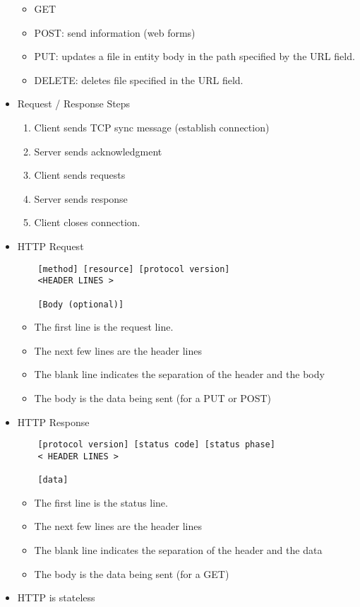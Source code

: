 \documentclass[]{article}
\providecommand{\tightlist}{%
  \setlength{\itemsep}{0pt}\setlength{\parskip}{0pt}}
\begin{document}
\begin{itemize}
  \begin{itemize}
  \tightlist
  \item
    GET
  \item
    POST: send information (web forms)
  \item
    PUT: updates a file in entity body in the path specified by the URL
    field.
  \item
    DELETE: deletes file specified in the URL field.
  \end{itemize}
\item
  Request / Response Steps

  \begin{enumerate}
  \def\labelenumi{\arabic{enumi}.}
  \tightlist
  \item
    Client sends TCP sync message (establish connection)
  \item
    Server sends acknowledgment
  \item
    Client sends requests
  \item
    Server sends response
  \item
    Client closes connection.
  \end{enumerate}
\item
  HTTP Request

\begin{verbatim}
    [method] [resource] [protocol version]
    <HEADER LINES >

    [Body (optional)]
\end{verbatim}

  \begin{itemize}
  \tightlist
  \item
    The first line is the request line.
  \item
    The next few lines are the header lines
  \item
    The blank line indicates the separation of the header and the body
  \item
    The body is the data being sent (for a PUT or POST)
  \end{itemize}
\item
  HTTP Response

\begin{verbatim}
    [protocol version] [status code] [status phase]
    < HEADER LINES >

    [data]
\end{verbatim}

  \begin{itemize}
  \tightlist
  \item
    The first line is the status line.
  \item
    The next few lines are the header lines
  \item
    The blank line indicates the separation of the header and the data
  \item
    The body is the data being sent (for a GET)
  \end{itemize}
\item
  HTTP is stateless


\end{itemize}
\end{document}
